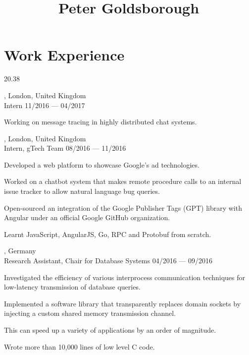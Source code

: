 




\begin{header}
	\title{Peter Goldsborough}
	\separate
	\separate
\end{header}

\section{Work Experience}{2}{0.38}

\begin{entry}
	{, London, United Kingdom}
	{\\Intern}
	{11/2016 --- 04/2017}
	\item Working on message tracing in highly distributed chat systems.
\end{entry}

\vspace{-2mm}
\begin{entry}
	{, London, United Kingdom}
	{\\Intern, gTech Team}
	{08/2016 --- 11/2016}
  \item Developed a web platform to showcase Google’s ad technologies.
  \item Worked on a chatbot system that makes remote procedure calls to an internal issue tracker to allow natural language bug queries.
  \item Open-sourced an integration of the Google Publisher Tags (GPT) library with Angular under an official Google GitHub organization.
  \item Learnt JavaScript, AngularJS, Go, RPC and Protobuf from scratch.
\end{entry}

\begin{entry}
	{, Germany}
	{\\Research Assistant, Chair for Database Systems}
	{04/2016 --- 09/2016}

  \item Investigated the efficiency of various interprocess communication techniques for low-latency transmission of database queries.
  \item Implemented a software library that transparently replaces domain sockets by injecting a custom shared memory transmission channel.
  \item This can speed up a variety of applications by an order of magnitude.
  \item Wrote more than 10,000 lines of low level C code.
\end{entry}

